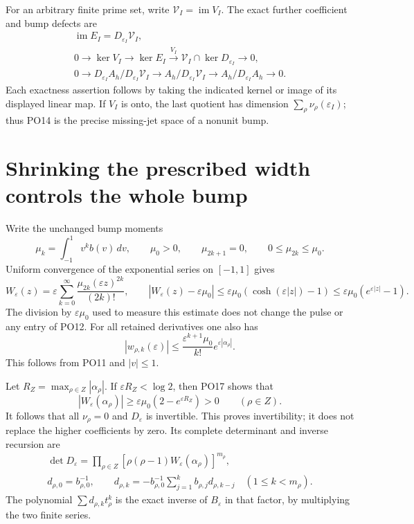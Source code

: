 \documentclass[11pt]{article}
\newcommand{\eps}{\varepsilon}
\newcommand{\im}{\operatorname{im}}
\begin{document}
For an arbitrary finite prime set, write \(\mathcal V_I=\im V_I\).
The exact further coefficient and bump defects are
\[
 \begin{gathered}
 \im E_I=D_{\eps_I}\mathcal V_I,\\
 0\longrightarrow\ker V_I\longrightarrow\ker E_I
     \xrightarrow{\,V_I\,}\mathcal V_I\cap\ker D_{\eps_I}
       \longrightarrow0,\\
 0\longrightarrow D_{\eps_I}A_h/D_{\eps_I}\mathcal V_I
   \longrightarrow A_h/D_{\eps_I}\mathcal V_I
   \longrightarrow A_h/D_{\eps_I}A_h\longrightarrow0 .
 \end{gathered}
 \tag{PO15}\label{po:defects}
\]
Each exactness assertion follows by taking the indicated kernel
or image of its displayed linear map. If \(V_I\) is onto,
the last quotient has dimension \(\sum_\rho\nu_\rho(\eps_I)\);
thus PO14 is the precise missing-jet space of a nonunit bump.

\section{Shrinking the prescribed width controls the whole bump}

Write the unchanged bump moments
\[
 \mu_k=\int_{-1}^1v^k b(v)\,dv,\qquad
 \mu_0>0,\qquad \mu_{2k+1}=0,\qquad 0\le\mu_{2k}\le\mu_0 .
 \tag{PO16}
\]
Uniform convergence of the exponential series on \([-1,1]\)
gives
\[
 W_\eps(z)=\eps\sum_{k=0}^\infty
              \frac{\mu_{2k}(\eps z)^{2k}}{(2k)!},
 \qquad
 |W_\eps(z)-\eps\mu_0|
       \le\eps\mu_0(\cosh(\eps|z|)-1)
       \le\eps\mu_0(e^{\eps|z|}-1).
 \tag{PO17}\label{po:unit-control}
\]
The division by \(\eps\mu_0\) used to measure this estimate does
not change the pulse or any entry of PO12.
For all retained derivatives one also has
\[
 |w_{\rho,k}(\eps)|
   \le\frac{\eps^{k+1}\mu_0}{k!}e^{\eps|\alpha_\rho|}.
 \tag{PO18}\label{po:derivative-bound}
\]
This follows from PO11 and \(|v|\le1\).

Let \(R_Z=\max_{\rho\in Z}|\alpha_\rho|\).
If \(\eps R_Z<\log2\), then PO17 shows that
\[
 |W_\eps(\alpha_\rho)|
   \ge\eps\mu_0(2-e^{\eps R_Z})>0
                    \qquad(\rho\in Z).
 \tag{PO19}\label{po:unit-criterion}
\]
It follows that all \(\nu_\rho=0\) and \(D_\eps\) is invertible.
This proves invertibility; it does not replace the higher
coefficients by zero. Its complete determinant and inverse recursion are
\[
 \begin{gathered}
 \det D_\eps=\prod_{\rho\in Z}
       [\rho(\rho-1)W_\eps(\alpha_\rho)]^{m_\rho},\\
 d_{\rho,0}=b_{\rho,0}^{-1},\qquad
 d_{\rho,k}=-b_{\rho,0}^{-1}
                \sum_{j=1}^k b_{\rho,j}d_{\rho,k-j}
                   \quad(1\le k<m_\rho).
 \end{gathered}
 \tag{PO20}\label{po:inverse}
\]
The polynomial \(\sum d_{\rho,k}t_\rho^k\) is the exact inverse
of \(B_\eps\) in that factor, by multiplying the two finite series.
\end{document}
